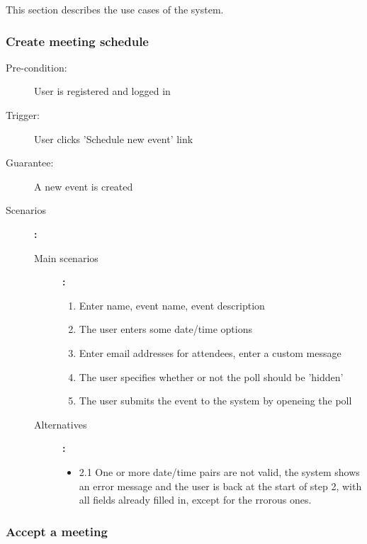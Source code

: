 This section describes the use cases of the system.

\subsubsection{Create meeting schedule}

\begin{description}
	\item[Pre-condition:] User is registered and logged in
	\item[Trigger:] User clicks 'Schedule new event' link
	\item[Guarantee:] A new event is created
	\item[Scenarios]\textbf{:}\\
				\begin{description}
					\item[Main scenarios]\textbf{:}\\
								\begin{enumerate}
									\item Enter name, event name, event description
									\item The user enters some date/time options
									\item Enter email addresses for attendees, enter a custom message
									\item The user specifies whether or not the poll should be 'hidden'
									\item The user submits the event to the system by openeing the poll
								\end{enumerate}
					\item[Alternatives]\textbf{:}\\
								\begin{itemize}
									\item 2.1 One or more date/time pairs are not valid, the system shows an error message and the user is back at the start of step 2, with all fields already filled in, except for the rrorous ones.
								\end{itemize}
				\end{description}
\end{description}


\subsubsection{Accept a meeting}

